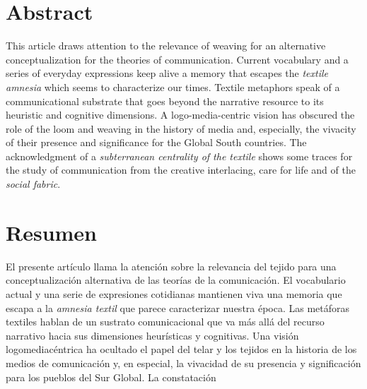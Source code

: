 \documentclass{tufte-handout}
\begin{document}
\begin{titlepage}
\vspace*{1em}




\hypertarget{abstract}{%
\section{Abstract}\label{abstract}}

This article draws attention to the relevance of weaving for an
alternative conceptualization for the theories of communication. Current
vocabulary and a series of everyday expressions keep alive a memory that
escapes the \emph{textile amnesia} which seems to characterize our times.
Textile metaphors speak of a communicational substrate that goes beyond
the narrative resource to its heuristic and cognitive dimensions. A logo-media-centric vision has obscured the role of the loom and weaving
in the history of media and, especially, the vivacity of their presence
and significance for the Global South countries. The acknowledgment of a
\emph{subterranean centrality of the textile} shows some traces for the study
of communication from the creative interlacing, care for life and of the
\emph{social fabric}.


\hypertarget{resumen}{%
\section{Resumen}\label{resumen}}

El presente artículo llama la atención sobre la relevancia del tejido
para una conceptualización alternativa de las teorías de la
comunicación. El vocabulario actual y una serie de expresiones
cotidianas mantienen viva una memoria que escapa a la \emph{amnesia
textil} que parece caracterizar nuestra época. Las metáforas textiles
hablan de un sustrato comunicacional que va más allá del recurso
narrativo hacia sus dimensiones heurísticas y cognitivas. Una visión
logomediacéntrica ha ocultado el papel del telar y los tejidos en la
historia de los medios de comunicación y, en especial, la vivacidad de
su presencia y significación para los pueblos del Sur Global. La
constatación


\enlargethispage{2\baselineskip}

\vspace*{2em}



 \end{titlepage}
\end{document}
